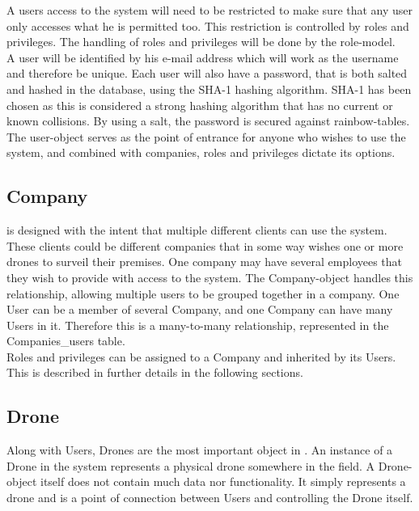 A users access to the system will need to be restricted to make sure that any user only accesses what he is permitted too.
This restriction is controlled by roles and privileges.
The handling of roles and privileges will be done by the role-model. \\

A user will be identified by his e-mail address which will work as the username and therefore be unique.
Each user will also have a password, that is both salted and hashed in the database, using the SHA-1 hashing algorithm. SHA-1 has been chosen as this is considered a strong hashing algorithm that has no current or known collisions. By using a salt, the password is secured against rainbow-tables.  \\

The user-object serves as the point of entrance for anyone who wishes to use the system, and combined with companies, roles and privileges dictate its options.


\subsection{Company}
\projectname{} is designed with the intent that multiple different clients can use the system.
These clients could be different companies that in some way wishes one or more drones to surveil their premises.
One company may have several employees that they wish to provide with access to the system.
The Company-object handles this relationship, allowing multiple users to be grouped together in a company.
One User can be a member of several Company, and one Company can have many Users in it.
Therefore this is a many-to-many relationship, represented in the Companies\_users table. \\

Roles and privileges can be assigned to a Company and inherited by its Users.
This is described in further details in the following sections.


\subsection{Drone}
Along with Users, Drones are the most important object in \projectname{}.
An instance of a Drone in the system represents a physical drone somewhere in the field.
A Drone-object itself does not contain much data nor functionality.
It simply represents a drone and is a point of connection between Users and controlling the Drone itself. \\

